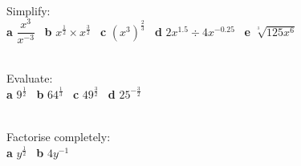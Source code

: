 \documentclass[fleqn]{article}
\begin{document}
\begin{examplebox}{}{}
	\\ %
	Simplify: \\
	\textbf{a}\hspace{2mm} $\dfrac{x^3}{x^{-3}}$											\hspace{7mm} \
	\textbf{b}\hspace{2mm} $x^{\textstyle\frac{1}{2}}\times x^{\textstyle\frac{3}{2}}$	\hspace{7mm} \
	\textbf{c}\hspace{2mm} $(x^3)^{\textstyle\frac{2}{3}}$								\hspace{7mm} \
	\textbf{d}\hspace{2mm} $2x^{1.5}\div 4x^{-0.25}$										\hspace{7mm} \
	\textbf{e}\hspace{2mm} $\sqrt[\textstyle{^3}]{125x^6}$								\hspace{7mm}
\end{examplebox}


\newpage
\begin{examplebox}{}{}
	\\ %
	Evaluate:
	\vspace{1.5mm}\\
	\textbf{a}\hspace{2mm} $9^{\textstyle\frac{1}{2}}$			\hspace{15mm} \
	\textbf{b}\hspace{2mm} $64^{\textstyle\frac{1}{3}}$	 	\hspace{15mm} \
	\textbf{c}\hspace{2mm} $49^{\textstyle\frac{3}{2}}$		\hspace{15mm} \
	\textbf{d}\hspace{2mm} $25^{-\textstyle\frac{3}{2}}$	 	\hspace{15mm}
\end{examplebox}
\vspace{9cm}
\begin{examplebox}{}{}
	\\ %
	Factorise completely:
	\vspace{1.5mm}\\
	\textbf{a}\hspace{2mm} $y^{\textstyle\frac{1}{2}}$		\hspace{15mm} \
	\textbf{b}\hspace{2mm} $4y^{-1}$	 			\hspace{7mm}
\end{examplebox}
\end{document}
